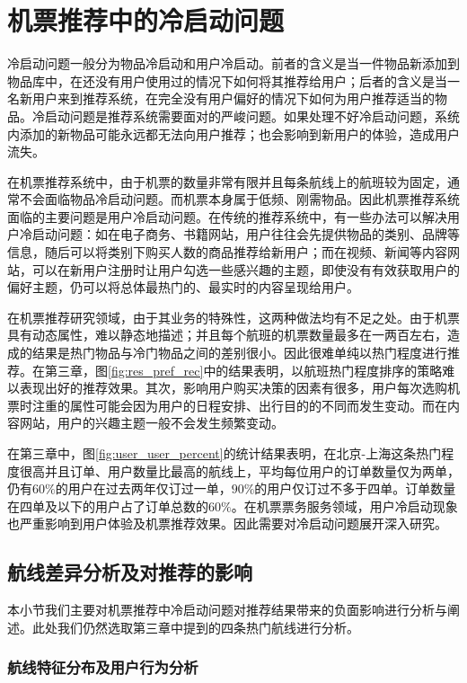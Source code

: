 
\chapter{机票推荐中的冷启动问题}
\label{chap:cold}

冷启动问题一般分为物品冷启动和用户冷启动。前者的含义是当一件物品新添加到物品库中，在还没有用户使用过的情况下如何将其推荐给用户；后者的含义是当一名新用户来到推荐系统，在完全没有用户偏好的情况下如何为用户推荐适当的物品。冷启动问题是推荐系统需要面对的严峻问题。如果处理不好冷启动问题，系统内添加的新物品可能永远都无法向用户推荐；也会影响到新用户的体验，造成用户流失。

在机票推荐系统中，由于机票的数量非常有限并且每条航线上的航班较为固定，通常不会面临物品冷启动问题。而机票本身属于低频、刚需物品。因此机票推荐系统面临的主要问题是用户冷启动问题。在传统的推荐系统中，有一些办法可以解决用户冷启动问题：如在电子商务、书籍网站，用户往往会先提供物品的类别、品牌等信息，随后可以将类别下购买人数的商品推荐给新用户；而在视频、新闻等内容网站，可以在新用户注册时让用户勾选一些感兴趣的主题，即使没有有效获取用户的偏好主题，仍可以将总体最热门的、最实时的内容呈现给用户。

在机票推荐研究领域，由于其业务的特殊性，这两种做法均有不足之处。由于机票具有动态属性，难以静态地描述；并且每个航班的机票数量最多在一两百左右，造成的结果是热门物品与冷门物品之间的差别很小。因此很难单纯以热门程度进行推荐。在第三章，图\ref{fig:res_pref_rec}中的结果表明，以航班热门程度排序的策略难以表现出好的推荐效果。其次，影响用户购买决策的因素有很多，用户每次选购机票时注重的属性可能会因为用户的日程安排、出行目的的不同而发生变动。而在内容网站，用户的兴趣主题一般不会发生频繁变动。

在第三章中，图\ref{fig:user_user_percent}的统计结果表明，在北京-上海这条热门程度很高并且订单、用户数量比最高的航线上，平均每位用户的订单数量仅为两单，仍有$60\%$的用户在过去两年仅订过一单，$90\%$的用户仅订过不多于四单。订单数量在四单及以下的用户占了订单总数的$60\%$。在机票票务服务领域，用户冷启动现象也严重影响到用户体验及机票推荐效果。因此需要对冷启动问题展开深入研究。


\section{航线差异分析及对推荐的影响}
本小节我们主要对机票推荐中冷启动问题对推荐结果带来的负面影响进行分析与阐述。此处我们仍然选取第三章中提到的四条热门航线进行分析。

\subsection{航线特征分布及用户行为分析}


